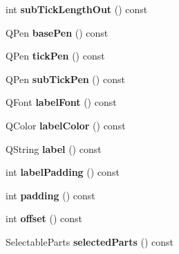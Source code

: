 \begin{DoxyCompactItemize}
\item 
int {\bfseries sub\+Tick\+Length\+Out} () const \hypertarget{classQCPAxis_a091fdf8d1b3f9660e38b854578efb9bc}{}\label{classQCPAxis_a091fdf8d1b3f9660e38b854578efb9bc}

\item 
Q\+Pen {\bfseries base\+Pen} () const \hypertarget{classQCPAxis_a4f6a7cd46fb104b1dad93e29cc78fe74}{}\label{classQCPAxis_a4f6a7cd46fb104b1dad93e29cc78fe74}

\item 
Q\+Pen {\bfseries tick\+Pen} () const \hypertarget{classQCPAxis_a5eb206da4265c6c083db71d692da3bc4}{}\label{classQCPAxis_a5eb206da4265c6c083db71d692da3bc4}

\item 
Q\+Pen {\bfseries sub\+Tick\+Pen} () const \hypertarget{classQCPAxis_a2e8bce6dd03e393dbdf6bb427461a726}{}\label{classQCPAxis_a2e8bce6dd03e393dbdf6bb427461a726}

\item 
Q\+Font {\bfseries label\+Font} () const \hypertarget{classQCPAxis_ae8029ae0b32e9d4d73dddcdd0a08c838}{}\label{classQCPAxis_ae8029ae0b32e9d4d73dddcdd0a08c838}

\item 
Q\+Color {\bfseries label\+Color} () const \hypertarget{classQCPAxis_a7854c2875e3b8d86b210d108bd87aeb9}{}\label{classQCPAxis_a7854c2875e3b8d86b210d108bd87aeb9}

\item 
Q\+String {\bfseries label} () const \hypertarget{classQCPAxis_ab3486dca5a6e9e3ca0e32678272ba549}{}\label{classQCPAxis_ab3486dca5a6e9e3ca0e32678272ba549}

\item 
int {\bfseries label\+Padding} () const \hypertarget{classQCPAxis_a59c9a0e362dec811491fc9a0709d2afa}{}\label{classQCPAxis_a59c9a0e362dec811491fc9a0709d2afa}

\item 
int {\bfseries padding} () const \hypertarget{classQCPAxis_abb85015a9467ec176e70698307ec833a}{}\label{classQCPAxis_abb85015a9467ec176e70698307ec833a}

\item 
int {\bfseries offset} () const \hypertarget{classQCPAxis_aebc032ac6eea164a02859c017f52d5e7}{}\label{classQCPAxis_aebc032ac6eea164a02859c017f52d5e7}

\item 
Selectable\+Parts {\bfseries selected\+Parts} () const \hypertarget{classQCPAxis_a08323248a1cba4750ef07ceea159e0b3}{}\label{classQCPAxis_a08323248a1cba4750ef07ceea159e0b3}


\end{DoxyCompactItemize}

